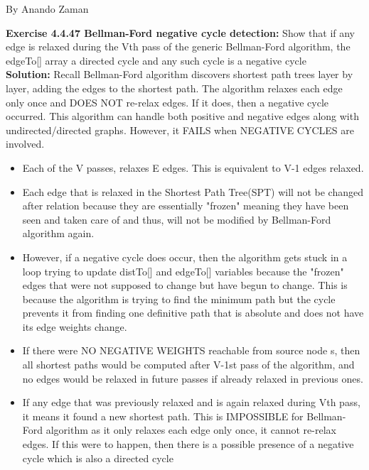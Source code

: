 \documentclass[11pt,fleqn]{article}
\begin{document}
By Anando Zaman


\textbf{Exercise 4.4.47 Bellman-Ford negative cycle detection:} Show that if any edge is relaxed during the Vth pass of the generic Bellman-Ford algorithm, the edgeTo[] array a directed cycle and any such cycle is a negative cycle\\

\textbf{Solution:} Recall Bellman-Ford algorithm discovers shortest path trees layer by layer, adding the edges to the shortest path. The algorithm relaxes each edge only once and DOES NOT re-relax edges. If it does, then a negative cycle occurred. This algorithm can handle both positive and negative edges along with undirected/directed graphs. However, it FAILS when NEGATIVE CYCLES are involved.

\begin{itemize}
	\item Each of the V passes, relaxes E edges. This is equivalent to V-1 edges relaxed.
	
	\item Each edge that is relaxed in the Shortest Path Tree(SPT) will not be changed after relation because they are essentially "frozen" meaning they have been seen and taken care of and thus, will not be modified by Bellman-Ford algorithm again.
	
	\item However, if a negative cycle does occur, then the algorithm gets stuck in a loop trying to update distTo[] and edgeTo[] variables because the "frozen" edges that were not supposed to change but have begun to change. This is because the algorithm is trying to find the minimum path but the cycle prevents it from finding one definitive path that is absolute and does not have its edge weights change.
	
	\item If there were NO NEGATIVE WEIGHTS reachable from source node s, then all shortest paths would be computed after V-1st pass of the algorithm, and no edges would be relaxed in future passes if already relaxed in previous ones.
	
	\item If any edge that was previously relaxed and is again relaxed during Vth pass, it means it found a new shortest path. This is IMPOSSIBLE for Bellman-Ford algorithm as it only relaxes each edge only once, it cannot re-relax edges. If this were to happen, then there is a possible presence of a negative cycle which is also a directed cycle
\end{itemize}
\end{document}

